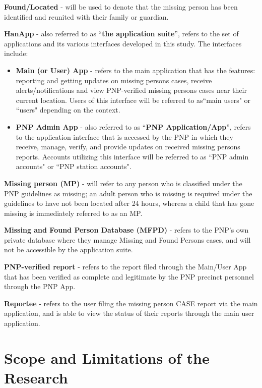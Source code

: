 \textbf{Found/Located} - will be used to denote that the missing person has been identified and reunited with their family or guardian.

\textbf{HanApp} -  also referred to as “\textbf{the application suite}”, refers to the set of applications and its various interfaces developed in this study. The interfaces include:
\newpage
\begin{itemize}
    \item \textbf{Main (or User) App} - refers to the main application that has the features: reporting and getting updates on missing persons cases, receive alerts/notifications and view PNP-verified missing persons cases near their current location. Users of this interface will be referred to as``main users" or ``users" depending on the context.
    \item \textbf{PNP Admin App} - also referred to as ``\textbf{PNP Application/App}”, refers to the application interface that is accessed by the PNP in which they receive, manage, verify, and provide updates on received missing persons reports. Accounts utilizing this interface will be referred to as ``PNP admin accounts" or ``PNP station accounts". 
\end{itemize}

\textbf{Missing person (MP)} - will refer to any person who is classified under the PNP guidelines as missing; an adult person who is missing is required under the guidelines to have not been located after 24 hours, whereas a child that has gone missing is immediately referred to as an MP.

\textbf{Missing and Found Person Database (MFPD)} - refers to the PNP’s own private database where they manage Missing and Found Persons cases, and will not be accessible by the application suite.

\textbf{PNP-verified report} - refers to the report filed through the Main/User App that has been verified as complete and legitimate by the PNP precinct personnel through the PNP App.

\textbf{Reportee} - refers to the user filing the missing person CASE report via the main application, and is able to view the status of their reports through the main user application.

\section{Scope and Limitations of the Research}
\label{sec:scopelimitations}

